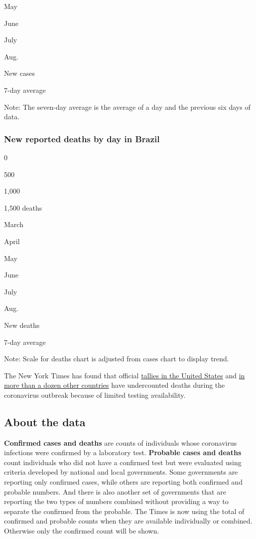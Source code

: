 May

June

July

Aug.

New cases

7-day average

Note: The seven-day average is the average of a day and the previous six
days of data.

\hypertarget{new-reported-deaths-by-day-in-brazil}{%
\subsubsection{New reported deaths by day in
Brazil}\label{new-reported-deaths-by-day-in-brazil}}

0

500

1,000

1,500 deaths

March

April

May

June

July

Aug.

New deaths

7-day average

Note: Scale for deaths chart is adjusted from cases chart to display
trend.

The New York Times has found that official
\href{https://www.nytimes3xbfgragh.onion/interactive/2020/04/28/us/coronavirus-death-toll-total.html}{tallies
in the United States} and
\href{https://www.nytimes3xbfgragh.onion/interactive/2020/04/21/world/coronavirus-missing-deaths.html}{in
more than a dozen other countries} have undercounted deaths during the
coronavirus outbreak because of limited testing availability.

\hypertarget{about-the-data}{%
\subsection{About the data}\label{about-the-data}}

\textbf{Confirmed cases and deaths} are counts of individuals whose
coronavirus infections were confirmed by a laboratory test.
\textbf{Probable cases and deaths} count individuals who did not have a
confirmed test but were evaluated using criteria developed by national
and local governments. Some governments are reporting only confirmed
cases, while others are reporting both confirmed and probable numbers.
And there is also another set of governments that are reporting the two
types of numbers combined without providing a way to separate the
confirmed from the probable. The Times is now using the total of
confirmed and probable counts when they are available individually or
combined. Otherwise only the confirmed count will be shown.

